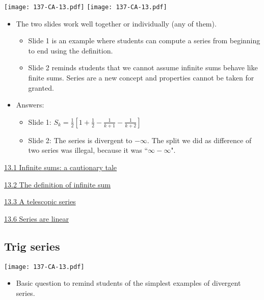 \documentclass[11pt]{article}
\newcommand {\DS} [1] {${\displaystyle #1}$}
\newcommand{\nl}{\hfill \vspace{-1.1\baselineskip}} %
\newcommand{\vi}{\hspace{8mm} \href{https://www.youtube.com/watch?v=vJCGp9luzlc&list=PLlwePzQY_wW-FJMnD_ybkXU_jZLVtZttI}{13.1 Infinite sums: a cautionary tale} }
\newcommand{\vii}{\hspace{8mm} \href{https://www.youtube.com/watch?v=VccmKguRkeY&list=PLlwePzQY_wW-FJMnD_ybkXU_jZLVtZttI&index=2}{13.2 The definition of infinite sum} }
\newcommand{\viii}{\hspace{8mm} \href{https://www.youtube.com/watch?v=OfDw7AoVXYs&list=PLlwePzQY_wW-FJMnD_ybkXU_jZLVtZttI&index=3}{13.3 A telescopic series} }
\newcommand{\vvi}{\hspace{8mm} \href{https://www.youtube.com/watch?v=x8zxHukU-UE&list=PLlwePzQY_wW-FJMnD_ybkXU_jZLVtZttI&index=6}{13.6 Series are linear} }
\begin{document}
\begin{center}
{ \texttt{[image: 137-CA-13.pdf]}}  \quad
{ \texttt{[image: 137-CA-13.pdf]}} 
\end{center}

\begin{comments}
\nl
	\begin{itemize}
		\item The two slides work well together or individually (any of them).
			\begin{itemize}
				\item    Slide 1 is an example where students  can compute a series from beginning to end using the definition.
				\item  Slide 2 reminds students that we cannot assume infinite sums behave like finite sums.  Series are a new concept and properties cannot be taken for granted.
			\end{itemize}
		\item Answers:
			\begin{itemize}
				\item  Slide 1:  \; \DS{S_k = \frac{1}{2} \left[ 1 + \frac{1}{2} - \frac{1}{k+1} - \frac{1}{k+2} \right]}
				\item  Slide 2: \; The series is divergent to $-\infty$.  The split we did as difference of two series was illegal, because it was ``$\infty - \infty$".
			\end{itemize}
	\end{itemize}
\end{comments}

\begin{videos}
\vi

\vii

\viii

\vvi
\end{videos}

\newpage
\subsection{Trig series}

\begin{center}
{ \texttt{[image: 137-CA-13.pdf]}} 
\end{center}

\begin{comments}
\nl
	\begin{itemize}
		\item   Basic question to remind students of the simplest examples of divergent series.
	\end{itemize}
\end{comments}
\end{document}
